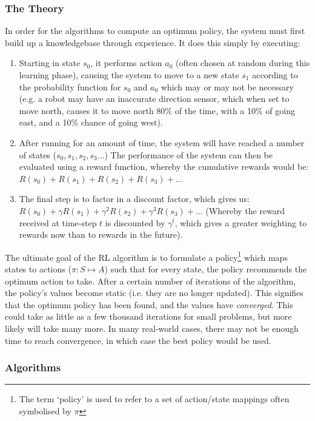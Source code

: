 \documentclass[a4paper,oneside]{report}
\begin{document}
\subsubsection{The Theory} 

In order for the algorithms to compute an optimum policy, the system must first build up a knowledgebase through experience. It does this simply by executing:

\begin{enumerate}
	\item Starting in state $s_0$, it performs action $a_0$ (often chosen at random during this learning phase), causing the system to move to a new state $s_1$ according to the probability function for $s_0$ and $a_0$ which may or may not be necessary (e.g. a robot may have an inaccurate direction sensor, which when set to move north, causes it to move north 80\% of the time, with a 10\% of going east, and a 10\% chance of going west).
	\item After running for an amount of time, the system will have reached a number of states ($s_0, s_1, s_2, s_3 ...$) The performance of the system can then be evaluated using a reward function, whereby the cumulative rewards would be: $R(s_0) + R(s_1) + R(s_2) + R(s_3) + ...$
	\item The final step is to factor in a discount factor, which gives us: $R(s_0) + \gamma R(s_1) + \gamma^2 R(s_2) + \gamma^3 R(s_3) + ...$ (Whereby the reward received at time-step $t$ is discounted by $\gamma^t$, which gives a greater weighting to rewards now than to rewards in the future).
\end{enumerate}

The ultimate goal of the RL algorithm is to formulate a policy\footnote{The term `policy' is used to refer to a set of action/state mappings often symbolised by $\pi$} which maps states to actions ($\pi: S \mapsto A$) such that for every state, the policy recommends the optimum action to take. After a certain number of iterations of the algorithm, the policy's values become static (i.e. they are no longer updated). This signifies that the optimum policy has been found, and the values have \emph{converged}. This could take as little as a few thousand iterations for small problems, but more likely will take many more. In many real-world cases, there may not be enough time to reach convergence, in which case the best policy would be used.

\subsubsection{Algorithms}
\end{document}
